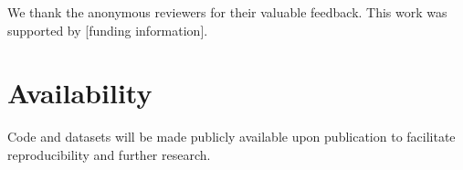 We thank the anonymous reviewers for their valuable feedback. This work was supported by [funding information].

\section*{Availability}

Code and datasets will be made publicly available upon publication to facilitate reproducibility and further research.






